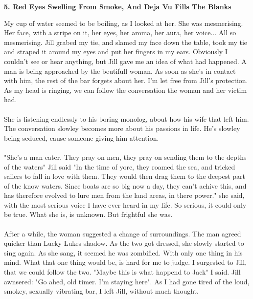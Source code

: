 \documentclass[]{article}
\begin{document}
	\newpage 
	
	\begin{center}
		\large\textbf{5. Red Eyes Swelling From Smoke, \newline And Deja Vu Fills The Blanks}
	\end{center}
	
	My cup of water seemed to be boiling, as I looked at her. She was mesmerising. Her face, with a stripe on it, her eyes, her aroma, her aura, her voice... All so mesmerising. Jill grabed my tie, and slamed my face down the table, took my tie and straped it around my eyes and put her fingers in my ears. Obviously I couldn't see or hear anything, but Jill gave me an idea of what had happened. A man is being approached by the beutifull woman. As soon as she's in contact with him, the rest of the bar forgets about her. I'm let free from Jill's protection. As my head is ringing, we can follow the conversation the woman and her victim had. 
	\\ \\
	She is listening endlessly to his boring monolog, about how his wife that left him. The conversation slowley becomes more about his passions in life. He's slowley being seduced, cause someone giving him attention.
	\\ \\
	"She's a man eater. They pray on men, they pray on sending them to the depths of the waters" Jill said "In the time of yore, they roamed the sea, and tricked sailers to fall in love with them. They would then drag them to the deepest part of the know waters. Since boats are so big now a day, they can't achive this, and has therefore evolved to lure men from the land areas, in there power." she said, with the most serious voice I have ever heard in my life. So serious, it could only be true. What she is, is unknown. But frightful she was. 
	\\ \\
	After a while, the woman suggested a change of surroundings. The man agreed quicker than Lucky Lukes shadow. As the two got dressed, she slowly started to sing again. As she sang, it seemed he was zombified. With only one thing in his mind. What that one thing would be, is hard for me to judge. I surgested to Jill, that we could follow the two. "Maybe this is what happend to Jack" I said. Jill awnsered: "Go ahed, old timer. I'm staying here". As I had gone tired of the loud, smokey, sexually vibrating bar, I left Jill, without much thought. 
	\\ \\
\end{document}
